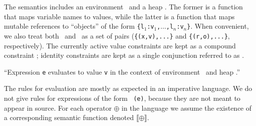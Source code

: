 
The semantics includes an environment \Euid\ and a heap \Huid. The former is
a function that maps variable names to values, while the latter is a
function that maps mutable references to ``objects'' of the form {\tt \{l$_1$:v$_1$,$\ldots$,l$_n$:v$_n$\}}. When convenient,
we also treat both \Euid\ and \Huid\ as a set of pairs (\texttt{\{(x,v),...\}}
and \texttt{\{(r,o),...\}}, respectively). The currently active value
constraints are kept as a compound constraint \C; identity constraints
are kept as a single conjunction referred to as \I.


``Expression \texttt{e} evaluates to value \texttt{v} in the context of
environment \Euid~and heap \Huid.''

The rules for evaluation are mostly as expected in an imperative
language. We do not give rules for expressions of the form \texttt{
  \Deref(e)}, because they are not meant to appear in source. For each
operator $\oplus$ in the language we assume the existence of a
corresponding semantic function denoted
$\llbracket \oplus \rrbracket$.








